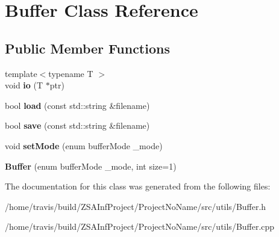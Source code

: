 \hypertarget{classBuffer}{\section{Buffer Class Reference}
\label{classBuffer}
}
\subsection*{Public Member Functions}
\begin{DoxyCompactItemize}
\item 
\hypertarget{classBuffer_a0c119cd2bde0f5e099ae5a7d603edf57}{{\footnotesize template$<$typename T $>$ }\\void {\bfseries io} (T $\ast$ptr)}\label{classBuffer_a0c119cd2bde0f5e099ae5a7d603edf57}

\item 
\hypertarget{classBuffer_a3658c31d018d2b35aece3adc7b174607}{bool {\bfseries load} (const std\-::string \&filename)}\label{classBuffer_a3658c31d018d2b35aece3adc7b174607}

\item 
\hypertarget{classBuffer_a7972aa16337fe9ad4ea68bbd384cae5e}{bool {\bfseries save} (const std\-::string \&filename)}\label{classBuffer_a7972aa16337fe9ad4ea68bbd384cae5e}

\item 
\hypertarget{classBuffer_a9b59c9981c93320d2ce9d383aef7e4c6}{void {\bfseries set\-Mode} (enum buffer\-Mode \-\_\-mode)}\label{classBuffer_a9b59c9981c93320d2ce9d383aef7e4c6}

\item 
\hypertarget{classBuffer_a4715e0d06e79cfa7c69a77ab240b437c}{{\bfseries Buffer} (enum buffer\-Mode \-\_\-mode, int size=1)}\label{classBuffer_a4715e0d06e79cfa7c69a77ab240b437c}

\end{DoxyCompactItemize}


The documentation for this class was generated from the following files\-:\begin{DoxyCompactItemize}
\item 
/home/travis/build/\-Z\-S\-A\-Inf\-Project/\-Project\-No\-Name/src/utils/Buffer.\-h\item 
/home/travis/build/\-Z\-S\-A\-Inf\-Project/\-Project\-No\-Name/src/utils/Buffer.\-cpp\end{DoxyCompactItemize}

